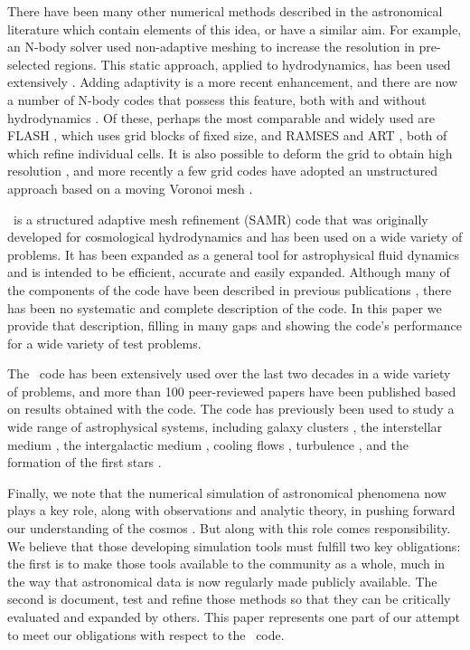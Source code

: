 There have been many other numerical methods described in the astronomical literature which contain elements of this idea, or have a similar aim.  For example, an N-body solver \citep{Villumsen89} used non-adaptive meshing to increase the resolution in pre-selected regions.  This static approach, applied to hydrodynamics, has been used extensively \citep[e.g.,][]{Ruffert94, Anninos94}.  Adding adaptivity is a more recent enhancement, and there are now a number of N-body codes that possess this feature, both with and without  hydrodynamics  \citep{Couchman91, Jessop94, Suisalu95, Splinter96, Gelato97, ART97, Truelove98, flash_method, MLAPM01,  Yahagi01, RAMSES, Quilis04, Ziegler05, Zhang06, Astrobear09, Pluto-amr, GAMER, Nyx}.  Of these, perhaps the most comparable and widely used are FLASH \citep{flash_method}, which uses grid blocks of fixed size, and RAMSES \citep{RAMSES} and ART \citep{ART97}, both of which refine individual cells.   It is also possible to deform the grid to obtain high resolution \citep[e.g.,][]{Gnedin95, Xu97, Pen98}, and more recently a few grid codes have adopted an unstructured approach based on a moving Voronoi mesh \citep{Arepo10, Tess11}.

\enzo\ is a structured adaptive mesh refinement (SAMR) code that was originally developed for cosmological hydrodynamics and has been used on a wide variety of problems.  It has been expanded as a general tool for astrophysical fluid dynamics and is intended to be efficient, accurate and easily expanded.  Although many of the components of the code have been described in previous publications \citep{1995CoPhC..89..149B, BryanThesis96, Bryan97a, Bryan97b, Norman99, BryanCompSci99, Bryan01, Oshea04, 2007arXiv0705.1556N}, there has been no systematic and complete description of the code.  In this paper we provide that description, filling in many gaps and showing the code's performance for a wide variety of test problems.

The \enzo\ code has been extensively used over the last two decades in a wide variety of problems, and more than 100 peer-reviewed papers have been published based on results obtained with the code.  The code has previously been used to study a wide range of astrophysical systems, including galaxy clusters \citep{Loken02}, the interstellar medium \citep{Slyz05}, the intergalactic medium \citep{Fang01}, cooling flows \citep{Li12}, turbulence \citep{Kritsuk04}, and the formation of the first stars \citep{ABN02}.

Finally, we note that the numerical simulation of astronomical phenomena now plays a key role, along with observations and analytic theory, in pushing forward our understanding of the cosmos \citep[e.g.,][]{DecadalSurvey01, DecadalSurvey10}.   But along with this role comes responsibility.  We believe that those developing simulation tools must fulfill two key obligations: the first is to make those tools available to the community as a whole, much in the way that astronomical data is now regularly made publicly available.  The second is document, test and refine those methods so that they can be critically evaluated and expanded by others.  This paper represents one part of our attempt to meet our obligations with respect to the \enzo\ code.

